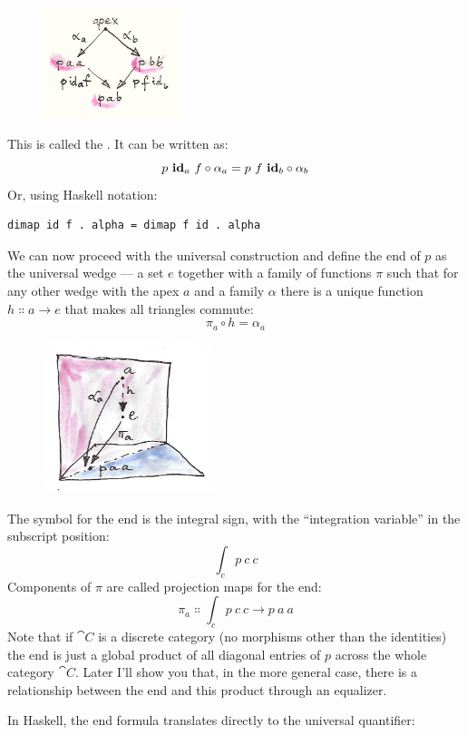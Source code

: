 \begin{figure}[H]
\centering
\includegraphics[width=40mm]{images/end-2.jpg}
\end{figure}

\noindent
This is called the . It can be written as:
\[p\ \idarrow[a]\ f \circ \alpha_a = p\ f\ \idarrow[b] \circ \alpha_b\]
Or, using Haskell notation:

\begin{Verbatim}
dimap id f . alpha = dimap f id . alpha
\end{Verbatim}
We can now proceed with the universal construction and define the end of
$p$ as the universal wedge --- a set $e$ together with a
family of functions $\pi$ such that for any other wedge with the
apex $a$ and a family $\alpha$ there is a unique function
$h \Colon a \to e$ that makes all triangles commute:
\[\pi_a \circ h = \alpha_a\]

\begin{figure}[H]
\centering
\includegraphics[width=50mm]{images/end-21.jpg}
\end{figure}

\noindent
The symbol for the end is the integral sign, with the ``integration
variable'' in the subscript position:
\[\int_c p\ c\ c\]
Components of $\pi$ are called projection maps for the end:
\[\pi_a \Colon \int_c p\ c\ c \to p\ a\ a\]
Note that if $\cat{C}$ is a discrete category (no morphisms other than
the identities) the end is just a global product of all diagonal entries
of $p$ across the whole category $\cat{C}$. Later I'll show you
that, in the more general case, there is a relationship between the end
and this product through an equalizer.

In Haskell, the end formula translates directly to the universal
quantifier:

